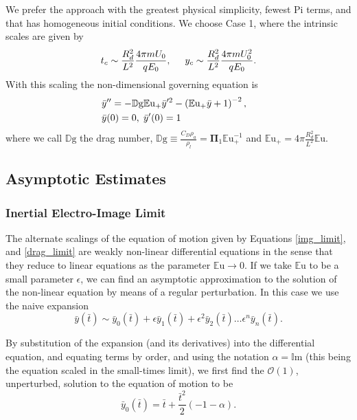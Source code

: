 \documentclass[a4paper, 12pt]{article}
\begin{document}
We prefer the approach with the greatest physical simplicity, fewest Pi terms, and that has homogeneous initial conditions. We choose Case 1, where the intrinsic scales are given by
\[ t_c \sim \frac{R_d^2}{L^2} \frac{4 \pi m U_0}{q E_0}, \hspace{5mm} y_c \sim \frac{R_d^2}{L^2} \frac{4 \pi m U_0^2}{q E_0}.
\]
With this scaling the non-dimensional governing equation is 
\begin{eqnarray}
&\bar{y}'' = - \mathbb{D}\mbox{g} \mathbb{E}\mbox{u}_+ \bar{y}'^2 - \left( \mathbb{E}\mbox{u}_+ \bar{y} + 1 \right)^{-2}, & \nonumber \\
& \bar{y}(0) = 0, \hspace{1 mm} \bar{y}'(0) = 1 & \label{drag_limit}
\end{eqnarray}
where we call $\mathbb{D}\mbox{g}$ the drag number, $\mathbb{D}\mbox{g} \equiv \frac{C_D \rho_a}{\rho_l} = \mathbf{\Pi}_1 {\mathbb{E}\mbox{u}}_+^{-1}$ and $\mathbb{E}\mbox{u}_+ = 4 \pi \frac{R_d^2}{L^2} \mathbb{E}\mbox{u}$.

\subsection{Asymptotic Estimates}
\subsubsection{Inertial Electro-Image Limit}

The alternate scalings of the equation of motion given by Equations \ref{img_limit}, and \ref{drag_limit} are weakly non-linear differential equations in the sense that they reduce to linear equations as the parameter $\mathbb{E}\mbox{u} \rightarrow 0$. If we take $\mathbb{E}\mbox{u}$ to be a small parameter $\epsilon$, we can find an asymptotic approximation to the solution of the non-linear equation by means of a regular perturbation. In this case we use the naive expansion
\[ \bar{y}(\bar{t}) \sim \bar{y}_0(\bar{t}) + \epsilon \bar{y}_1(\bar{t}) + \epsilon^2 \bar{y}_2(\bar{t}) \ldots \epsilon^n\bar{y}_n(\bar{t})  
.\]

By substitution of the expansion (and its derivatives) into the differential equation, and equating terms by order, and using the notation $\alpha = \mathbb{I}\mbox{m}$ (this being the equation scaled in the small-times limit), we first find the $\mathcal{O}(1)$, unperturbed, solution to the equation of motion to be
\[{\bar{y}_{0}}{\left (\bar{t} \right )} = \bar{t} + \frac{\bar{t}^{2}}{2} \left(-1 - \alpha\right). \]
\end{document}
